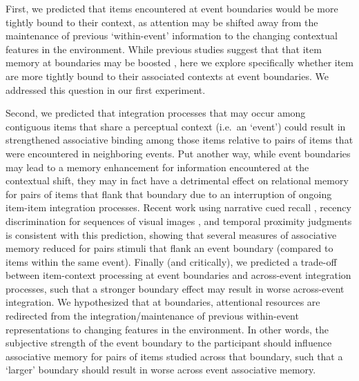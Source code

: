 First, we predicted that items encountered at event boundaries would be
more tightly bound to their context, as attention may be shifted away
from the maintenance of previous `within-event' information to the
changing contextual features in the environment. While previous studies
suggest that that item memory at boundaries may be boosted
\autocites{boltz_temporal_1992}{newtson_perceptual_1976}{schwan_cognitive_2004},
here we explore specifically whether item are more tightly bound to
their associated contexts at event boundaries. We addressed this
question in our first experiment.

Second, we predicted that integration processes that may occur among
contiguous items that share a perceptual context (i.e.~an `event') could
result in strengthened associative binding among those items relative to
pairs of items that were encountered in neighboring events. Put another
way, while event boundaries may lead to a memory enhancement for
information encountered at the contextual shift, they may in fact have a
detrimental effect on relational memory for pairs of items that flank
that boundary due to an interruption of ongoing item-item integration
processes. Recent work using narrative cued recall
\autocite{ezzyat_what_2011}, recency discrimination for sequences of
visual images \autocite{dubrow_influence_2013}, and temporal proximity
judgments \autocite{ezzyat_similarity_2014} is consistent with this
prediction, showing that several measures of associative memory reduced
for pairs stimuli that flank an event boundary (compared to items within
the same event). Finally (and critically), we predicted a trade-off
between item-context processing at event boundaries and across-event
integration processes, such that a stronger boundary effect may result
in worse across-event integration. We hypothesized that at boundaries,
attentional resources are redirected from the integration/maintenance of
previous within-event representations to changing features in the
environment. In other words, the subjective strength of the event
boundary to the participant should influence associative memory for
pairs of items studied across that boundary, such that a `larger'
boundary should result in worse across event associative memory.

